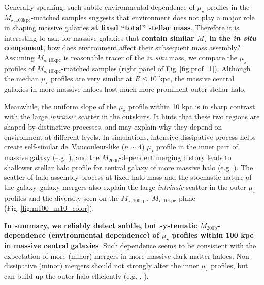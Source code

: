 \documentclass[a4paper,fleqn,usenatbib]{mnras}
\def\mstar{{$M_{\star}$}}
\def\mhalo{{$M_{\mathrm{200b}}$}}
\def\minn{{$M_{\star,10\mathrm{kpc}}$}}
\def\mtot{{$M_{\star,100\mathrm{kpc}}$}}
\def\mden{{$\mu_{\star}$}}
\begin{document}
    Generally speaking, such subtle environmental dependence of \mden{} profiles in 
    the \mtot{}-matched samples suggests that environment does not play a major role 
    in shaping massive galaxies \textbf{at fixed ``total'' stellar mass}.
    Therefore it is interesting to ask, for massive galaxies that \textbf{contain 
    similar \mstar{} in the \textit{in situ} component}, how does environment affect 
    their subsequent mass assembly?
    Assuming \minn{} is reasonable tracer of the \textit{in situ} mass, we compare the 
    \mden{} profiles of \minn{}-matched samples (right panel of Fig~\ref{fig:prof_1}).  
    Although the median \mden{} profiles are very similar at $R \leq 10$ kpc, the
    massive central galaxies in more massive haloes host much more prominent outer 
    stellar halo. 
    
    Meanwhile, the uniform slope of the \mden{} profile within 10 kpc is in sharp 
    contrast with the large \textit{intrinsic} scatter in the outskirts. 
    It hints that these two regions are shaped by distinctive processes, and may 
    explain why they depend on environment at different levels.  
    In simulations, intensive dissipative process helps create 
    self-similar de~Vaucouleur-like ($n{\sim} 4$) \mden{} profile in the inner part 
    of massive galaxy (e.g. \citealt{Hopkins2008}), and the \mhalo{}-dependent
    merging history leads to shallower stellar halo profile for central galaxy 
    of more massive halo (e.g. \citealt{Pillepich2014}). 
    The scatter of halo assembly process at fixed halo mass and the stochastic 
    nature of the galaxy--galaxy mergers also explain the large \textit{intrinsic} 
    scatter in the outer \mden{} profiles and the diversity seen on the 
    \mtot{}--\minn{} plane (Fig~\ref{fig:m100_m10_color}).

    \textbf{In summary, we reliably detect subtle, but systematic \mhalo{}-dependence 
    (environmental dependence) of \mden{} profiles within 100 kpc in massive central 
    galaxies}. 
    Such dependence seems to be consistent with the expectation of more (minor) 
    mergers in more massive dark matter haloes. 
    Non-dissipative (minor) mergers should not strongly alter the inner \mden{} 
    profiles, but can build up the outer halo efficiently
    (e.g. \citealt{Hilz2013}, \citealt{Oogi2013}).
      

\end{document}
